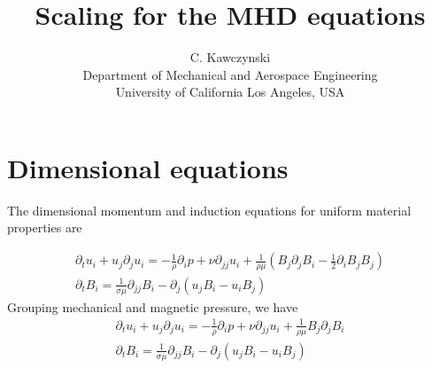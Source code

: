 \documentclass[11pt]{article}
\newcommand{\PD}{\partial}
\begin{document}
\doublespacing
\title{Scaling for the MHD equations}
\author{C. Kawczynski \\
Department of Mechanical and Aerospace Engineering \\
University of California Los Angeles, USA\\
}
\maketitle

\section{Dimensional equations}
The dimensional momentum and induction equations for uniform material properties are

\begin{equation}\begin{aligned}
\PD_t u_i+u_j\PD_j u_i = -\frac{1}{\rho} \PD_i p+ \nu \PD_{jj} u_i + \frac{1}{\rho \mu} (B_j \PD_j B_i - \tfrac{1}{2} \PD_i B_j B_j) \\
\PD_t B_i = \frac{1}{\sigma \mu} \PD_{jj} B_i - \PD_j (u_j B_i - u_i B_j)
\end{aligned}\end{equation}
Grouping mechanical and magnetic pressure, we have
\begin{equation}\boxed{\begin{aligned}
\PD_t u_i+u_j\PD_j u_i = -\frac{1}{\rho} \PD_i p+ \nu \PD_{jj} u_i + \frac{1}{\rho \mu} B_j \PD_j B_i \\
\PD_t B_i = \frac{1}{\sigma \mu} \PD_{jj} B_i - \PD_j (u_j B_i - u_i B_j)
\end{aligned}}\end{equation}
\end{document}
